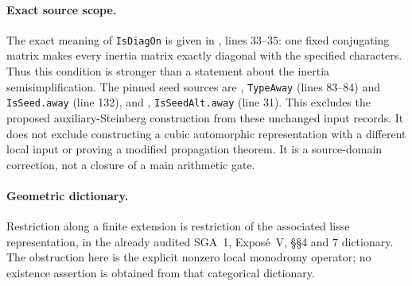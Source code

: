 \paragraph{Exact source scope.}
The exact meaning of \texttt{IsDiagOn} is given in
,
lines 33--35: one fixed conjugating matrix makes every inertia
matrix exactly diagonal with the specified characters.  Thus
this condition is stronger than a statement about the inertia
semisimplification.  The pinned seed sources are
,
\texttt{TypeAway} (lines 83--84) and \texttt{IsSeed.away}
(line 132), and
,
\texttt{IsSeedAlt.away} (line 31).
This excludes the proposed auxiliary-Steinberg construction from
these unchanged input records.  It does not exclude constructing a
cubic automorphic representation with a different local input or
proving a modified propagation theorem.  It is a source-domain
correction, not a closure of a main arithmetic gate.

\paragraph{Geometric dictionary.}
Restriction along a finite extension is restriction of the associated
lisse representation, in the already audited SGA~1, Expos\'e~V,
\S\S4 and 7 dictionary.  The obstruction here is the explicit
nonzero local monodromy operator; no existence assertion is obtained
from that categorical dictionary.
